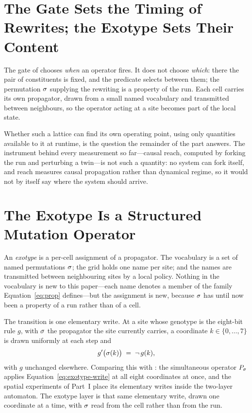 \section{The Gate Sets the Timing of Rewrites; the Exotype Sets Their Content}
\label{sec:exotype-intro}

The gate of  chooses \emph{when} an operator
fires. It does not choose \emph{which}: there the pair of constituents is fixed, and the
predicate selects between them; the permutation $\sigma$ supplying the rewriting is
a property of the run.  Each
cell carries its own propagator, drawn from a small named vocabulary and
transmitted between neighbours, so the operator acting at a site becomes part of
the local state.

Whether such a lattice can find its own operating point, using only
quantities available to it at runtime, is the question the remainder of the
part answers. The instrument behind every measurement so far---causal reach,
computed by forking the run and perturbing a twin---is not such a quantity:
no system can fork itself, and reach measures causal propagation rather than
dynamical regime, so it would not by itself say where the system should
arrive.

\section{The Exotype Is a Structured Mutation Operator}
\label{sec:exotype-layer}

An \emph{exotype} is a per-cell assignment of a propagator. The vocabulary is a
set of named permutations $\sigma$; the grid holds one name per site; and the
names are transmitted between neighbouring sites by a local policy. Nothing in
the vocabulary is new to this paper---each name denotes a member of the family
Equation~\eqref{eq:prop} defines---but the assignment is new, because $\sigma$ has
until now been a property of a run rather than of a cell.

The transition is one elementary write. At a site whose genotype is the
eight-bit rule $g$, with $\sigma$ the propagator the site currently carries, a
coordinate $k \in \{0,\dots,7\}$ is drawn uniformly at each step and
%
\begin{equation}
  g'\bigl(\sigma(k)\bigr) \;=\; \neg\, g(k),
  \label{eq:exotype-write}
\end{equation}
%
with $g$ unchanged elsewhere. Comparing this with : the
simultaneous operator $P_\sigma$ applies Equation~\eqref{eq:exotype-write} at all
eight coordinates at once, and the spatial experiments of Part~I place its
elementary writes inside the two-layer automaton. The exotype layer is that same
elementary write, drawn one coordinate at a time, with $\sigma$ read from the cell
rather than from the run.

